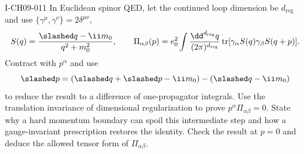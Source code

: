 \begin{exercise}{I-CH09-011}
In Euclidean spinor QED, let
the continued loop dimension be $d_{\mathrm{reg}}$ and use
$\{\gamma^\mu,\gamma^\nu\}=2\delta^{\mu\nu}$,
\[
  S(q)=\frac{\slashed q-\ii m_0}{q^2+m_0^2},
  \qquad
  \Pi_{\alpha\beta}(p)=e_0^2\int\frac{\dd^{d_{\mathrm{reg}}}q}{(2\pi)^{d_{\mathrm{reg}}}}
  \operatorname{tr}[\gamma_\alpha S(q)\gamma_\beta S(q+p)].
\]
Contract with $p^\alpha$ and use
\[
  \slashed p=(\slashed q+\slashed p-\ii m_0)
             -(\slashed q-\ii m_0)
\]
to reduce the result to a difference of one-propagator integrals.  Use the
translation invariance of dimensional regularization to prove
$p^\alpha\Pi_{\alpha\beta}=0$.  State why a hard momentum boundary can spoil
this intermediate step and how a gauge-invariant prescription restores the
identity.  Check the result at $p=0$ and deduce the allowed tensor form of
$\Pi_{\alpha\beta}$.
\end{exercise}
